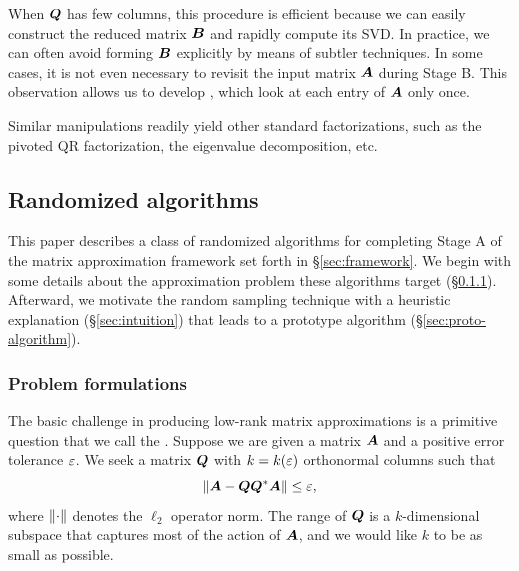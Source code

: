 \documentclass[final]{siamltex}
\newcounter{algorithm}[section]
\begin{document}
When $\bm{Q}$ has few columns, this procedure is efficient
because we can easily construct the reduced matrix $\bm{B}$ and rapidly compute its SVD.
In practice, we can often avoid forming $\bm{B}$
explicitly by means of subtler techniques.  In some cases,
it is not even necessary to revisit the input matrix $\bm{A}$
during Stage B.  This observation allows us to develop
, which look at each
entry of $\bm{A}$ only once.

Similar manipulations readily yield other standard factorizations,
such as the pivoted QR factorization, the eigenvalue decomposition, etc.



\subsection{Randomized algorithms}
\label{sec:sketchofalgorithm}

This paper describes a class of randomized algorithms for completing Stage A
of the matrix approximation framework set forth in \S\ref{sec:framework}.
We begin with some details about the approximation problem these algorithms
target (\S\ref{sec:modelproblem}).
Afterward, we motivate the random sampling technique
with a heuristic explanation (\S\ref{sec:intuition})
that leads to a prototype algorithm (\S\ref{sec:proto-algorithm}).


\subsubsection{Problem formulations}
\label{sec:modelproblem}

The basic challenge in producing low-rank matrix approximations
is a primitive question that we call the .  Suppose we are given a matrix
$\bm{A}$ and a positive error tolerance $\varepsilon$.
We seek a matrix $\bm{Q}$ with $k = k(\varepsilon)$ orthonormal columns
such that
\begin{equation} \label{eq:fixed_precision}
\norm{ \mtx{A} - \mtx{QQ}^\adj \mtx{A} } \leq \eps,
\end{equation}
where $\left\Vert { \cdot } \right\Vert$ denotes the $\ell_2$ operator norm.
The range of $\bm{Q}$ is a $k$-dimensional subspace that captures most of the
action of $\bm{A}$, and we would like $k$ to be as small as possible.
\end{document}
